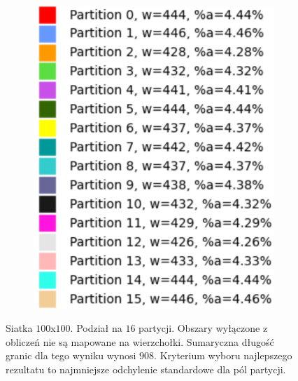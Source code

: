 \begin{figure}[h]
\begin{subfigure}{.33\textwidth}
    \caption[short]{}
\end{subfigure}%
\begin{subfigure}{.33\textwidth}
    \centering
    \includegraphics[width=0.9\linewidth]{images/results/m_k/with/17/results}
    \caption[short]{}
\end{subfigure}
\caption{Siatka $100$x$100$. Podział na $16$ partycji.
Obszary wyłączone z obliczeń nie są mapowane na wierzchołki.
Sumaryczna długość granic dla tego wyniku wynosi $908$.
Kryterium wyboru najlepszego rezultatu to najmniejsze odchylenie standardowe dla pól partycji.}
\label{result:17}
\end{figure}
